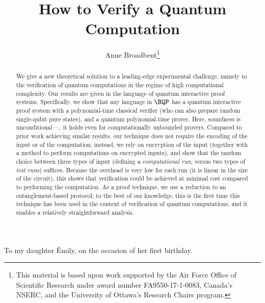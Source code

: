 \documentclass{toc}
\begin{document}
\begin{frontmatter}[classification=text]
\title{How to Verify a Quantum Computation}

\author[broadbent]{Anne Broadbent\thanks{This material is based upon work supported by the Air Force Office of Scientific Research under award number FA9550-17-1-0083, Canada's NSERC, and the University of Ottawa's Research Chairs program.
}}

\begin{dedication}
  To my daughter \'Emily, on the occasion of her first birthday.
\end{dedication}

%
\begin{abstract}
We give a new theoretical solution to a leading-edge experimental challenge, namely to the verification of quantum computations in the regime of high computational complexity.
Our results are given in the language of quantum interactive proof systems. Specifically, we show that any language in $\BQP$ has a quantum interactive proof system with a polynomial-time classical verifier (who can also prepare random single-qubit pure states), and a quantum polynomial-time prover. Here, soundness is unconditional---\ie,~it holds even for computationally unbounded provers. Compared to prior work achieving similar results, our technique does not require the encoding of the input or of the computation; instead, we rely on encryption of the input (together with a method to perform computations on encrypted inputs), and show that the random choice between three types of input (defining a \emph{computational run}, versus two types of \emph{test runs}) suffices. Because the overhead is very low for each run (it is linear in the size of the circuit), this shows that verification could be achieved at minimal cost compared to performing the computation.  As a proof technique, we use a reduction to an entanglement-based protocol; to the best of our knowledge, this is the first time this technique has been used in the context of verification of quantum computations, and it enables a relatively straightforward analysis.
\end{abstract}


%

\end{frontmatter}
\end{document}
